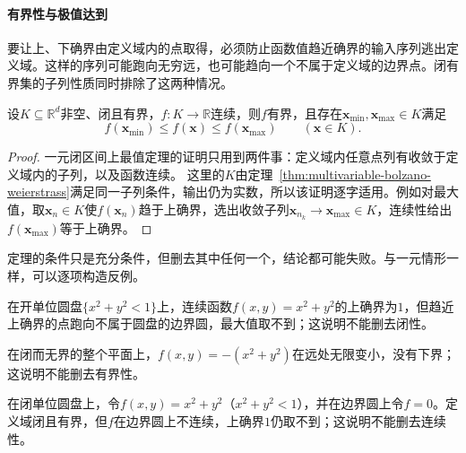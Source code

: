 \paragraph{有界性与极值达到}
要让上、下确界由定义域内的点取得，必须防止函数值趋近确界的输入序列逃出定义域。这样的序列可能跑向无穷远，也可能趋向一个不属于定义域的边界点。闭有界集的子列性质同时排除了这两种情况。
\begin{theorem}[闭有界集上的极值定理]
\label{thm:multivariable-extreme-value}
\label{thm:ls-extreme-value}
设$K\subseteq\mathbb R^d$非空、闭且有界，$f:K\to\mathbb R$连续，则$f$有界，且存在$\bm x_{\min},\bm x_{\max}\in K$满足
\[
 f(\bm x_{\min})\leq f(\bm x)\leq f(\bm x_{\max})\qquad(\bm x\in K).
\]
\end{theorem}
\begin{proof}
一元闭区间上最值定理的证明只用到两件事：定义域内任意点列有收敛于定义域内的子列，以及函数连续。
这里的$K$由定理~\ref{thm:multivariable-bolzano-weierstrass}满足同一子列条件，输出仍为实数，所以该证明逐字适用。例如对最大值，取$\bm x_n\in K$使$f(\bm x_n)$趋于上确界，选出收敛子列$\bm x_{n_k}\to\bm x_{\max}\in K$，连续性给出$f(\bm x_{\max})$等于上确界。
\end{proof}
定理的条件只是充分条件，但删去其中任何一个，结论都可能失败。与一元情形一样，可以逐项构造反例。
\begin{example}
\label{ex:multivariable-extreme-value-failures}
在开单位圆盘$\{x^2+y^2<1\}$上，连续函数$f(x,y)=x^2+y^2$的上确界为$1$，但趋近上确界的点跑向不属于圆盘的边界圆，最大值取不到；这说明不能删去闭性。

在闭而无界的整个平面上，$f(x,y)=-(x^2+y^2)$在远处无限变小，没有下界；这说明不能删去有界性。

在闭单位圆盘上，令$f(x,y)=x^2+y^2$（$x^2+y^2<1$），并在边界圆上令$f=0$。定义域闭且有界，但$f$在边界圆上不连续，上确界$1$仍取不到；这说明不能删去连续性。
\end{example}

